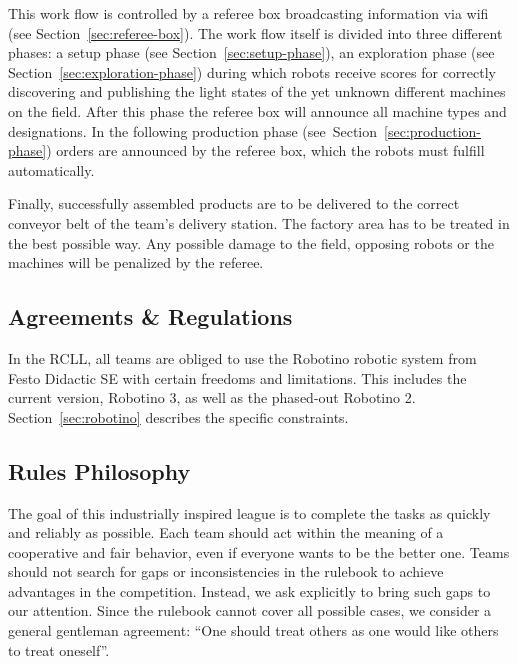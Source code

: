 \documentclass[12pt,twoside]{article}
\newcommand{\refsec}[1]{Section~\ref{#1}}
\begin{document}
This work flow is controlled by a referee box broadcasting information
via wifi (see \refsec{sec:referee-box}). The work flow itself is
divided into three different phases: a setup
phase (see \refsec{sec:setup-phase}), an exploration phase (see
\refsec{sec:exploration-phase}) during which robots receive scores for
correctly discovering and publishing the light states of the yet
unknown different machines on the field. After this phase the referee
box will announce all machine types and designations. In the following
production phase (see~\refsec{sec:production-phase}) orders are
announced by the referee box, which the robots must fulfill
automatically.

Finally, 
successfully assembled products are to be delivered to the correct
conveyor belt of the team's delivery station. The factory
area has to be treated in the best possible way. Any possible damage
to the field, opposing robots or the machines will be penalized by the
referee.

\subsection{Agreements \& Regulations}
\label{sec:agreements}
In the RCLL, all teams are obliged to use the Robotino robotic system
from Festo Didactic SE with certain freedoms and limitations. This
includes the current version, Robotino 3, as well as the phased-out
Robotino 2. \refsec{sec:robotino} describes the specific constraints.



\subsection{Rules Philosophy}
\label{sec:rules-philosphy}
The goal of this industrially inspired league is to complete the tasks
as quickly and reliably as possible. Each team should act within the
meaning of a cooperative and fair behavior, even if everyone wants to
be the better one. Teams should not search for gaps or inconsistencies
in the rulebook to achieve advantages in the competition. Instead, we
ask explicitly to bring such gaps to our attention. Since the rulebook
cannot cover all possible cases, we consider a general gentleman
agreement: ``One should treat others as one would like others to treat
oneself''.

\end{document}
